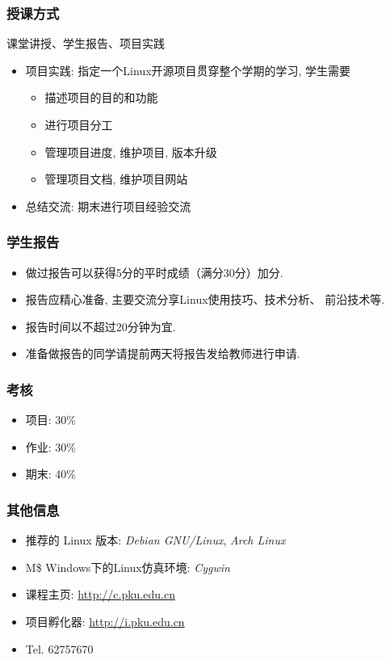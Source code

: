 \documentclass[compress]{beamer}
\begin{document}
\begin{frame}
  \frametitle{授课方式}
  课堂讲授、学生报告、项目实践
  \begin{itemize}
	\item 项目实践: 指定一个Linux开源项目贯穿整个学期的学习, 学生需要
		  \begin{itemize}
			\item 描述项目的目的和功能
			\item 进行项目分工
			\item 管理项目进度, 维护项目, 版本升级
			\item 管理项目文档, 维护项目网站
		  \end{itemize}
	\item 总结交流: 期末进行项目经验交流
  \end{itemize}
\end{frame}

\begin{frame}
    \frametitle{学生报告}
    \begin{itemize}
        \item 做过报告可以获得5分的平时成绩（满分30分）加分. 
        \item 报告应精心准备, 主要交流分享Linux使用技巧、技术分析、
            前沿技术等.
        \item 报告时间以不超过20分钟为宜.
        \item 准备做报告的同学请提前两天将报告发给教师进行申请.
    \end{itemize}
\end{frame}

\begin{frame}
  \frametitle{考核}
  \begin{itemize}
	\item 项目: 30\%
	\item 作业: 30\%
	\item 期末: 40\%
  \end{itemize}
\end{frame}

\begin{frame}
\frametitle{其他信息}
\begin{itemize}
	\item 推荐的 Linux 版本: \emph{Debian GNU/Linux}, \emph{Arch
		Linux}
\item M\$ Windows下的Linux仿真环境: \emph{Cygwin}
\item 课程主页:
\href{http://c.pku.edu.cn}{http://c.pku.edu.cn}
\item 项目孵化器: \href{http://i.pku.edu.cn}{http://i.pku.edu.cn}
\item Tel. 62757670
\end{itemize}
\end{frame}
\end{document}

